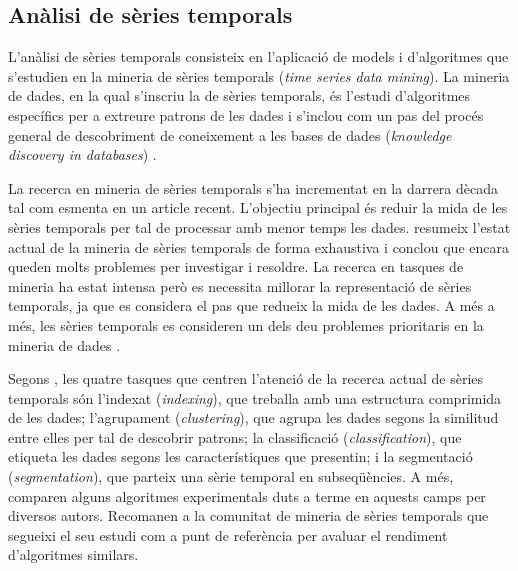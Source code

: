 \subsection{Anàlisi de sèries temporals}

L'anàlisi de sèries temporals consisteix en l'aplicació de models i d'algoritmes que s'estudien en la mineria de sèries temporals (\emph{time series data mining}). La mineria de dades, en la qual s'inscriu la de sèries temporals, és l'estudi d'algoritmes específics per a extreure patrons de les dades i s'inclou com un pas del procés general de descobriment de coneixement a les bases de dades (\emph{knowledge discovery in databases}) \parencite{fayyad96,last01}.

La recerca en mineria de sèries temporals s'ha incrementat en la darrera dècada tal com esmenta \textcite{fu11} en un article recent. L'objectiu principal és reduir la mida de les sèries temporals per tal de processar amb menor temps les dades.
\citeauthor{fu11} resumeix l'estat actual de la mineria de sèries temporals de forma exhaustiva i conclou que encara queden molts problemes per investigar i resoldre. La recerca en tasques de mineria ha estat intensa però es necessita millorar la representació de sèries temporals, ja que es considera el pas que redueix la mida de les dades. A més a més, les sèries temporals es consideren un dels deu problemes prioritaris  en la mineria de dades \parencite{yangwu06}.

Segons \textcite{keogh02}, les quatre tasques que centren l'atenció de la recerca actual de sèries temporals són
l'indexat (\emph{indexing}), que treballa amb una estructura comprimida de les dades;
l'agrupament (\emph{clustering}), que agrupa les dades segons la similitud entre elles per tal de descobrir patrons;
la classificació (\emph{classification}), que etiqueta les dades segons les característiques que presentin;
i la segmentació (\emph{segmentation}), que parteix una sèrie temporal en subseqüències.
A més, \citeauthor{keogh02} comparen  alguns algoritmes experimentals duts a terme en aquests camps per diversos autors. Recomanen a la comunitat de mineria de sèries temporals que segueixi el seu estudi com a punt de referència per avaluar el rendiment d'algoritmes similars.

